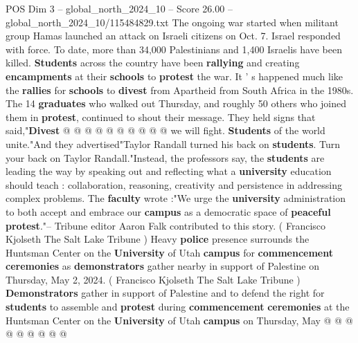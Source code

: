\begin{textsample}{POS Dim 3 – global\_north\_2024\_10 – Score 26.00 – global\_north\_2024\_10/115484829.txt}
The ongoing war started when militant group Hamas launched an attack on Israeli citizens on Oct. 7.
Israel responded with force.
To date, more than 34,000 Palestinians and 1,400 Israelis have been killed. \textbf{Students} across the country have been \textbf{rallying} and creating \textbf{encampments} at their \textbf{schools} to \textbf{protest} the war.
It ' s happened much like the \textbf{rallies} for \textbf{schools} to \textbf{divest} from Apartheid from South Africa in the 1980s.
The 14 \textbf{graduates} who walked out Thursday, and roughly 50 others who joined them in \textbf{protest}, continued to shout their message.
They held signs that said,"\textbf{Divest} @ @ @ @ @ @ @ @ @ @ we will fight. \textbf{Students} of the world unite."And they advertised"Taylor Randall turned his back on \textbf{students}.
Turn your back on Taylor Randall."Instead, the professors say, the \textbf{students} are leading the way by speaking out and reflecting what a \textbf{university} education should teach : collaboration, reasoning, creativity and persistence in addressing complex problems.
The \textbf{faculty} wrote :"We urge the \textbf{university} administration to both accept and embrace our \textbf{campus} as a democratic space of \textbf{peaceful} \textbf{protest}."-- Tribune editor Aaron Falk contributed to this story. ( Francisco Kjolseth The Salt Lake Tribune ) Heavy \textbf{police} presence surrounds the Huntsman Center on the \textbf{University} of Utah \textbf{campus} for \textbf{commencement} \textbf{ceremonies} as \textbf{demonstrators} gather nearby in support of Palestine on Thursday, May 2, 2024. ( Francisco Kjolseth The Salt Lake Tribune ) \textbf{Demonstrators} gather in support of Palestine and to defend the right for \textbf{students} to assemble and \textbf{protest} during \textbf{commencement} \textbf{ceremonies} at the Huntsman Center on the \textbf{University} of Utah \textbf{campus} on Thursday, May @ @ @ @ @ @ @ @ @

\end{textsample}
